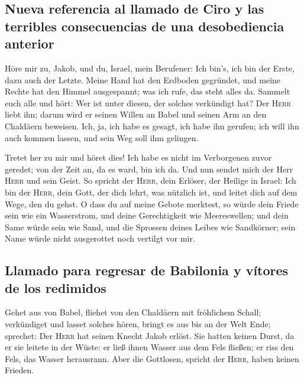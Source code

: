 \hypertarget{nueva-referencia-al-llamado-de-ciro-y-las-terribles-consecuencias-de-una-desobediencia-anterior}{%
\subsection{Nueva referencia al llamado de Ciro y las terribles
consecuencias de una desobediencia
anterior}\label{nueva-referencia-al-llamado-de-ciro-y-las-terribles-consecuencias-de-una-desobediencia-anterior}}

 Höre mir zu, Jakob, und du, Israel, mein Berufener: Ich
bin's, ich bin der Erste, dazu auch der Letzte.  Meine
Hand hat den Erdboden gegründet, und meine Rechte hat den Himmel
ausgespannt; was ich rufe, das steht alles da.  Sammelt
euch alle und hört: Wer ist unter diesen, der solches verkündigt hat?
Der \textsc{Herr} liebt ihn; darum wird er seinen Willen an Babel und
seinen Arm an den Chaldäern beweisen.  Ich, ja, ich habe
es gesagt, ich habe ihn gerufen; ich will ihn auch kommen lassen, und
sein Weg soll ihm gelingen.

 Tretet her zu mir und höret dies! Ich habe es nicht im
Verborgenen zuvor geredet; von der Zeit an, da es ward, bin ich da. Und
nun sendet mich der Herr \textsc{Herr} und sein Geist. 
So spricht der \textsc{Herr}, dein Erlöser, der Heilige in Israel: Ich
bin der \textsc{Herr}, dein Gott, der dich lehrt, was nützlich ist, und
leitet dich auf dem Wege, den du gehst.  O dass du auf
meine Gebote merktest, so würde dein Friede sein wie ein Wasserstrom,
und deine Gerechtigkeit wie Meereswellen;  und dein Same
würde sein wie Sand, und die Sprossen deines Leibes wie Sandkörner; sein
Name würde nicht ausgerottet noch vertilgt vor mir.

\hypertarget{llamado-para-regresar-de-babilonia-y-vuxedtores-de-los-redimidos}{%
\subsection{Llamado para regresar de Babilonia y vítores de los
redimidos}\label{llamado-para-regresar-de-babilonia-y-vuxedtores-de-los-redimidos}}

 Gehet aus von Babel, fliehet von den Chaldäern mit
fröhlichem Schall; verkündiget und lasset solches hören, bringt es aus
bis an der Welt Ende; sprechet: Der \textsc{Herr} hat seinen Knecht
Jakob erlöst.  Sie hatten keinen Durst, da er sie leitete
in der Wüste: er ließ ihnen Wasser aus dem Fels fließen; er riss den
Fels, das Wasser herausrann.  Aber die Gottlosen, spricht
der \textsc{Herr}, haben keinen Frieden.


